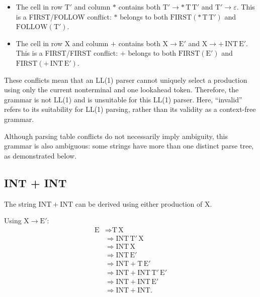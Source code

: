 \documentclass{article}
\begin{document}
\begin{itemize}
  \item The cell in row $\text{T}'$ and column $*$ contains both
  $\text{T}' \to *\,\text{T}\,\text{T}'$ and
  $\text{T}' \to \varepsilon$.
  This is a FIRST/FOLLOW conflict: $*$ belongs to both
  $\mathrm{FIRST}(*\,\text{T}\,\text{T}')$ and
  $\mathrm{FOLLOW}(\text{T}')$.

  \item The cell in row $\text{X}$ and column $+$ contains both
  $\text{X} \to \text{E}'$ and
  $\text{X} \to +\,\mathrm{INT}\,\text{E}'$.
  This is a FIRST/FIRST conflict: $+$ belongs to both
  $\mathrm{FIRST}(\text{E}')$ and
  $\mathrm{FIRST}(+\,\mathrm{INT}\,\text{E}')$.
\end{itemize}

These conflicts mean that an LL(1) parser cannot uniquely select a
production using only the current nonterminal and one lookahead token.
Therefore, the grammar is not LL(1) and is unsuitable for this LL(1)
parser. Here, ``invalid'' refers to its suitability for LL(1) parsing,
rather than its validity as a context-free grammar.

Although parsing table conflicts do not necessarily imply ambiguity,
this grammar is also ambiguous: some strings have more than one
distinct parse tree, as demonstrated below.

\subsection{INT + INT}

The string $\mathrm{INT} + \mathrm{INT}$ can be derived using either
production of $\text{X}$.

Using $\text{X} \to \text{E}'$:
\[
\begin{aligned}
\text{E}
  &\Rightarrow \text{T}\,\text{X} \\
  &\Rightarrow \mathrm{INT}\,\text{T}'\,\text{X} \\
  &\Rightarrow \mathrm{INT}\,\text{X} \\
  &\Rightarrow \mathrm{INT}\,\text{E}' \\
  &\Rightarrow \mathrm{INT} + \text{T}\,\text{E}' \\
  &\Rightarrow \mathrm{INT} + \mathrm{INT}\,\text{T}'\,\text{E}' \\
  &\Rightarrow \mathrm{INT} + \mathrm{INT}\,\text{E}' \\
  &\Rightarrow \mathrm{INT} + \mathrm{INT}.
\end{aligned}
\]
\end{document}
